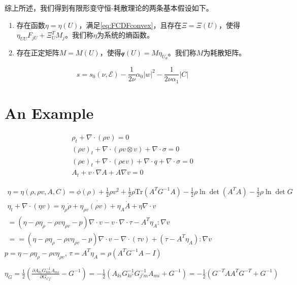 \documentclass{article}
\begin{document}
综上所述，我们得到有限形变守恒-耗散理论的两条基本假设如下。
\begin{enumerate}
		\item 存在函数$\eta = \eta (U)$，满足\eqref{eq:FCDFconvex}，且存在$\Xi=\Xi(U)$，使得$\eta_{UU} F_{jU} + \Xi_U^T M_j $。我们称$\eta$为系统的熵函数。
		\item 存在正定矩阵$M = M(U)$，使得$\mathcal{q}(U) = M \eta_{U_d}$。我们称$M$为耗散矩阵。
\end{enumerate}

 $$s = s_0(\nu,\mathcal{E}) - \frac{1}{2\nu} \alpha_0 |w|^2 - \frac{1}{2\nu\alpha_1} |C|$$


\section{An Example}
\begin{subequations}
\begin{align}
\rho_t + \nabla \cdot (\rho v )=0 \\
(\rho v)_t + \nabla \cdot (\rho v \otimes v) + \nabla \cdot \sigma = 0 \\
(\rho e)_t + \nabla \cdot (\rho e v) + \nabla \cdot q + \nabla \cdot \sigma = 0 \\
A_t + v \cdot \nabla A + A \nabla v = 0
\end{align}
\end{subequations}


\begin{eqnarray*}
\eta = \eta (\rho, \rho v, A, C)  = \phi(\rho) + \frac{1}{2} \rho v^2 + \frac{1}{2}\rho \mbox{Tr} (A^T G^{-1} A)  - \frac{1}{2} \rho \ln \det (A^TA) - \frac{1}{2} \rho \ln \det G \\
\eta_t + \nabla \cdot (\eta v ) = \eta_{\rho} \dot{\rho} + \eta_{\rho v} \dot {(\rho v)}  + \eta_{A} \dot{A}  + \eta \nabla \cdot v\\
= (\eta - \rho \eta_\rho -\rho v \eta_{\rho v} -p) \nabla \cdot v - v \cdot \nabla \cdot \tau  - A^T \eta_A : \nabla v	\\
== (\eta - \rho \eta_\rho -\rho v \eta_{\rho v} -p) \nabla \cdot v -  \nabla \cdot (\tau v)  + (\tau- A^T \eta_A ): \nabla v	
\end{eqnarray*}
$p = \eta - \rho \eta_\rho -\rho v \eta_{\rho v}$, $\tau = A^T\eta_A = \rho (A^T G^{-1} A - I)$

$\eta_{G} =\frac{1}{2} ( \frac{\partial A_{ki}G^{-1}_{km}  A_{mi} }{\partial G_{i'j'}} -G^{-1} )  = -\frac{1}{2} (A_{ki} G^{-1}_{ki'} G^{-1}_{j'm} A_{mi} + G^{-1}) = -\frac{1}{2} (G^{-T}A A^T G^{-T} + G^{-1}) $
\end{document}
